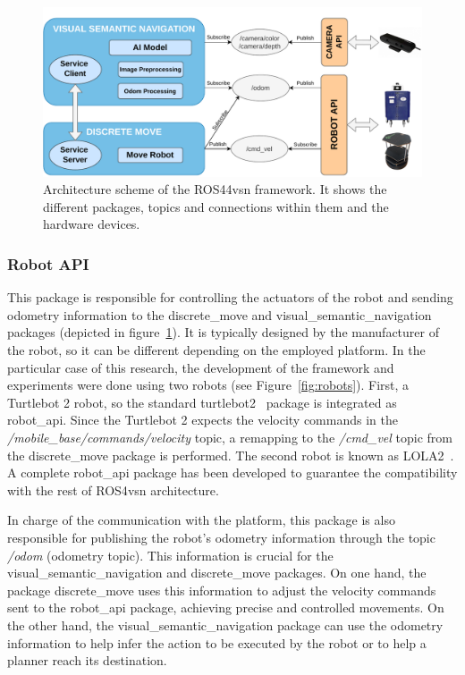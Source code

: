 \begin{figure}
    \centering
    \includegraphics[width=\linewidth]{figures/ros4vsn/arquitectura_paper}
    \caption{Architecture scheme of the ROS44\acrshort{vsn} framework.
    It shows the different packages, topics and connections within them and the hardware devices.}
    \label{fig:arch_scheme}
\end{figure}

\subsubsection{Robot API}\label{subsubsec:robot-api2}

This package is responsible for controlling the actuators of the robot and sending odometry information to the discrete\_move and visual\_semantic\_navi\-gation packages (depicted in figure~\ref{fig:arch_scheme}).
It is typically designed by the manufacturer of the robot, so it can be different depending on the employed platform.
In the particular case of this research, the development of the framework and experiments were done using two robots (see Figure~\ref{fig:robots}).
First, a Turtlebot 2 robot, so the standard turtlebot2~\cite{kobuki} package is integrated as robot\_api.
Since the Turtlebot 2 expects the velocity commands in the \textit{/mobile\_base/commands/velocity} topic, a remapping to the \textit{/cmd\_vel} topic from the discrete\_move package is performed.
The second robot is known as LOLA2~\cite{LOLA}.
A complete robot\_api package has been developed to guarantee the compatibility with the rest of ROS4\acrshort{vsn} architecture.

In charge of the communication with the platform, this package is also responsible for publishing the robot's odometry information through the topic \textit{/odom} (odometry topic).
This information is crucial for the visual\_seman\-tic\_navigation and discrete\_move packages.
On one hand, the package discrete\_move uses this information to adjust the velocity commands sent to the robot\_api package, achieving precise and controlled movements.
On the other hand, the visual\_semantic\_navigation package can use the odometry information to help infer the action to be executed by the robot or to help a planner reach its destination.

